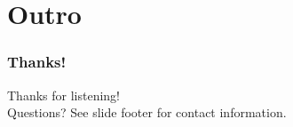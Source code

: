 \documentclass[t]{beamer}
\begin{document}


%







\section{Outro}

\begin{frame}
	\frametitle{Thanks!}
		\begin{center}
			\vfill
			Thanks for listening!\\
			\vfill
			Questions?
			\vfill
			See slide footer for contact information.
			\vfill
		\end{center}
\end{frame}
\end{document}
